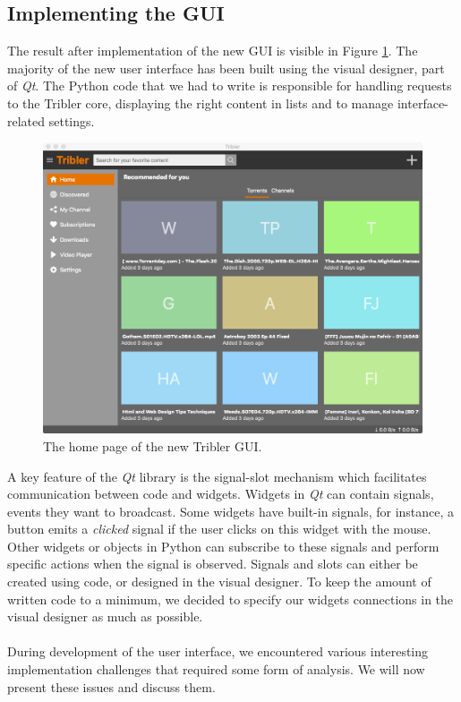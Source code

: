 \subsection{Implementing the GUI}
The result after implementation of the new GUI is visible in Figure \ref{fig:new-gui-1}. The majority of the new user interface has been built using the visual designer, part of \emph{Qt}. The Python code that we had to write is responsible for handling requests to the Tribler core, displaying the right content in lists and to manage interface-related settings.\\

\begin{figure}[t]
	\centering
	\includegraphics[width=1.0\columnwidth]{images/improving_qa/newgui1}
	\caption{The home page of the new Tribler GUI.}
	\label{fig:new-gui-1}
\end{figure}

A key feature of the \emph{Qt} library is the signal-slot mechanism which facilitates communication between code and widgets. Widgets in \emph{Qt} can contain signals, events they want to broadcast. Some widgets have built-in signals, for instance, a button emits a \emph{clicked} signal if the user clicks on this widget with the mouse. Other widgets or objects in Python can subscribe to these signals and perform specific actions when the signal is observed. Signals and slots can either be created using code, or designed in the visual designer. To keep the amount of written code to a minimum, we decided to specify our widgets connections in the visual designer as much as possible.\\\\
During development of the user interface, we encountered various interesting implementation challenges that required some form of analysis. We will now present these issues and discuss them.


